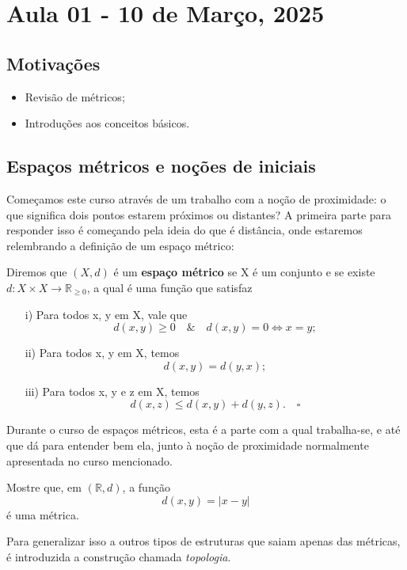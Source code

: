 \documentclass[../topology_notes.tex]{subfiles}
\begin{document}
\section{Aula 01 - 10 de Março, 2025}
\subsection{Motivações}
\begin{itemize}
	\item Revisão de métricos;
	\item Introduções aos conceitos básicos.
\end{itemize}
\subsection{Espaços métricos e noções de iniciais}
Começamos este curso através de um trabalho com a noção de proximidade: o que significa dois pontos estarem próximos ou distantes? A primeira parte para responder isso é começando pela ideia do que é distância, onde estaremos relembrando a definição de um espaço métrico:
\begin{def*}
	Diremos que \((X, d)\) é um \textbf{espaço métrico} se X é um conjunto e se existe \(d:X\times X\rightarrow \mathbb{R}_{\geq 0}\), a qual é uma função que satisfaz
	\begin{itemize}
		\item[i)] Para todos x, y em X, vale que
		      \[
			      d(x, y)\geq 0 \quad\&\quad d(x, y) = 0 \Leftrightarrow x = y;
		      \]
		\item[ii)] Para todos x, y em X, temos
		      \[
			      d(x, y) = d(y, x);
		      \]
		\item[iii)] Para todos x, y e z em X, temos
		      \[
			      d(x, z)\leq d(x, y) + d(y, z).\quad \square
		      \]
	\end{itemize}
\end{def*}
Durante o curso de espaços métricos, esta é a parte com a qual trabalha-se, e até que dá para entender bem ela, junto à noção de proximidade normalmente apresentada no curso mencionado.
\begin{exr}
	Mostre que, em \((\mathbb{R}, d)\), a função
	\[
		d(x,y) = |x-y|
	\]
	é uma métrica.
\end{exr}
Para generalizar isso a outros tipos de estruturas que saiam apenas das métricas, é introduzida a construção chamada \textit{topologia}.
\end{document}
